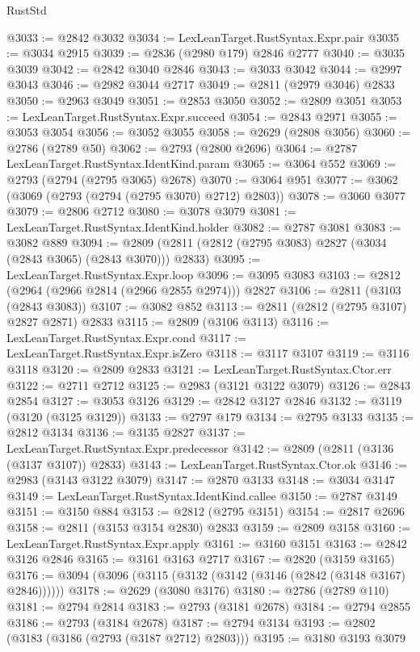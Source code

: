 \begin{lexlean}{RustStd}
\begin{coremodule}
{\begin{coremodule}
{{{{{{{{{{{{{{{{{{{{{{{{{{{{{{{{{@3033 := @2842 @3032
@3034 := LexLeanTarget.RustSyntax.Expr.pair
@3035 := @3034 @2915
@3039 := @2836 (@2980 @179) @2846 @2777
@3040 := @3035 @3039
@3042 := @2842 @3040 @2846
@3043 := @3033 @3042
@3044 := @2997 @3043
@3046 := @2982 @3044 @2717
@3049 := @2811 (@2979 @3046) @2833
@3050 := @2963 @3049
@3051 := @2853 @3050
@3052 := @2809 @3051
@3053 := LexLeanTarget.RustSyntax.Expr.succeed
@3054 := @2843 @2971
@3055 := @3053 @3054
@3056 := @3052 @3055
@3058 := @2629 (@2808 @3056)
@3060 := @2786 (@2789 @50)
@3062 := @2793 (@2800 @2696)
@3064 := @2787 LexLeanTarget.RustSyntax.IdentKind.param
@3065 := @3064 @552
@3069 := @2793 (@2794 (@2795 @3065) @2678)
@3070 := @3064 @951
@3077 := @3062 (@3069 (@2793 (@2794 (@2795 @3070) @2712) @2803))
@3078 := @3060 @3077
@3079 := @2806 @2712
@3080 := @3078 @3079
@3081 := LexLeanTarget.RustSyntax.IdentKind.holder
@3082 := @2787 @3081
@3083 := @3082 @889
@3094 := @2809 (@2811 (@2812 (@2795 @3083) @2827 (@3034 (@2843 @3065) (@2843 @3070))) @2833)
@3095 := LexLeanTarget.RustSyntax.Expr.loop
@3096 := @3095 @3083
@3103 := @2812 (@2964 (@2966 @2814 (@2966 @2855 @2974))) @2827
@3106 := @2811 (@3103 (@2843 @3083))
@3107 := @3082 @852
@3113 := @2811 (@2812 (@2795 @3107) @2827 @2871) @2833
@3115 := @2809 (@3106 @3113)
@3116 := LexLeanTarget.RustSyntax.Expr.cond
@3117 := LexLeanTarget.RustSyntax.Expr.isZero
@3118 := @3117 @3107
@3119 := @3116 @3118
@3120 := @2809 @2833
@3121 := LexLeanTarget.RustSyntax.Ctor.err
@3122 := @2711 @2712
@3125 := @2983 (@3121 @3122 @3079)
@3126 := @2843 @2854
@3127 := @3053 @3126
@3129 := @2842 @3127 @2846
@3132 := @3119 (@3120 (@3125 @3129))
@3133 := @2797 @179
@3134 := @2795 @3133
@3135 := @2812 @3134
@3136 := @3135 @2827
@3137 := LexLeanTarget.RustSyntax.Expr.predecessor
@3142 := @2809 (@2811 (@3136 (@3137 @3107)) @2833)
@3143 := LexLeanTarget.RustSyntax.Ctor.ok
@3146 := @2983 (@3143 @3122 @3079)
@3147 := @2870 @3133
@3148 := @3034 @3147
@3149 := LexLeanTarget.RustSyntax.IdentKind.callee
@3150 := @2787 @3149
@3151 := @3150 @884
@3153 := @2812 (@2795 @3151)
@3154 := @2817 @2696
@3158 := @2811 (@3153 @3154 @2830) @2833
@3159 := @2809 @3158
@3160 := LexLeanTarget.RustSyntax.Expr.apply
@3161 := @3160 @3151
@3163 := @2842 @3126 @2846
@3165 := @3161 @3163 @2717
@3167 := @2820 (@3159 @3165)
@3176 := @3094 (@3096 (@3115 (@3132 (@3142 (@3146 (@2842 (@3148 @3167) @2846))))))
@3178 := @2629 (@3080 @3176)
@3180 := @2786 (@2789 @110)
@3181 := @2794 @2814
@3183 := @2793 (@3181 @2678)
@3184 := @2794 @2855
@3186 := @2793 (@3184 @2678)
@3187 := @2794 @3134
@3193 := @2802 (@3183 (@3186 (@2793 (@3187 @2712) @2803)))
@3195 := @3180 @3193 @3079
}}}}}}}}}}}}}}}}}}}}}}}}}}}}}}}}}
\end{coremodule}}
\end{coremodule}
\end{lexlean}
